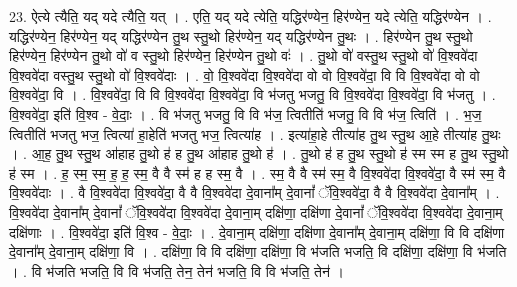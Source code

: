 \documentclass[17pt]{extarticle}
\begin{document}
23. ऐत्ये त्यैति॒ यद् यदे त्यैति॒ यत् । . एति॒ यद् यदे त्येति॒ यद्धिर॑ण्येन॒ हिर॑ण्येन॒ यदे त्येति॒ यद्धिर॑ण्येन । . यद्धिर॑ण्येन॒ हिर॑ण्येन॒ यद् यद्धिर॑ण्येन तु॒थ स्तु॒थो हिर॑ण्येन॒ यद् यद्धिर॑ण्येन तु॒थः । . हिर॑ण्येन तु॒थ स्तु॒थो हिर॑ण्येन॒ हिर॑ण्येन तु॒थो वो॑ व स्तु॒थो हिर॑ण्येन॒ हिर॑ण्येन तु॒थो वः॑ । . तु॒थो वो॑ वस्तु॒थ स्तु॒थो वो॑ वि॒श्ववे॑दा वि॒श्ववे॑दा वस्तु॒थ स्तु॒थो वो॑ वि॒श्ववे॑दाः । . वो॒ वि॒श्ववे॑दा वि॒श्ववे॑दा वो वो वि॒श्ववे॑दा॒ वि वि वि॒श्ववे॑दा वो वो वि॒श्ववे॑दा॒ वि । . वि॒श्ववे॑दा॒ वि वि वि॒श्ववे॑दा वि॒श्ववे॑दा॒ वि भ॑जतु भजतु॒ वि वि॒श्ववे॑दा वि॒श्ववे॑दा॒ वि भ॑जतु । . वि॒श्ववे॑दा॒ इति॑ वि॒श्व - वे॒दाः॒ । . वि भ॑जतु भजतु॒ वि वि भ॑ज॒ त्वितीति॑ भजतु॒ वि वि भ॑ज॒ त्विति॑ । . भ॒ज॒ त्वितीति॑ भजतु भज॒ त्वित्या॑ हा॒हेति॑ भजतु भज॒ त्वित्या॑ह । . इत्या॑हा॒हे तीत्या॑ह तु॒थ स्तु॒थ आ॒हे तीत्या॑ह तु॒थः । . आ॒ह॒ तु॒थ स्तु॒थ आ॑हाह तु॒थो ह॑ ह तु॒थ आ॑हाह तु॒थो ह॑ । . तु॒थो ह॑ ह तु॒थ स्तु॒थो ह॑ स्म स्म ह तु॒थ स्तु॒थो ह॑ स्म । . ह॒ स्म॒ स्म॒ ह॒ ह॒ स्म॒ वै वै स्म॑ ह ह स्म॒ वै । . स्म॒ वै वै स्म॑ स्म॒ वै वि॒श्ववे॑दा वि॒श्ववे॑दा॒ वै स्म॑ स्म॒ वै वि॒श्ववे॑दाः । . वै वि॒श्ववे॑दा वि॒श्ववे॑दा॒ वै वै वि॒श्ववे॑दा दे॒वाना᳚म् दे॒वानां᳚ ॅवि॒श्ववे॑दा॒ वै वै वि॒श्ववे॑दा दे॒वाना᳚म् । . वि॒श्ववे॑दा दे॒वाना᳚म् दे॒वानां᳚ ॅवि॒श्ववे॑दा वि॒श्ववे॑दा दे॒वाना॒म् दक्षि॑णा॒ दक्षि॑णा दे॒वानां᳚ ॅवि॒श्ववे॑दा वि॒श्ववे॑दा दे॒वाना॒म् दक्षि॑णाः । . वि॒श्ववे॑दा॒ इति॑ वि॒श्व - वे॒दाः॒ । . दे॒वाना॒म् दक्षि॑णा॒ दक्षि॑णा दे॒वाना᳚म् दे॒वाना॒म् दक्षि॑णा॒ वि वि दक्षि॑णा दे॒वाना᳚म् दे॒वाना॒म् दक्षि॑णा॒ वि । . दक्षि॑णा॒ वि वि दक्षि॑णा॒ दक्षि॑णा॒ वि भ॑जति भजति॒ वि दक्षि॑णा॒ दक्षि॑णा॒ वि भ॑जति । . वि भ॑जति भजति॒ वि वि भ॑जति॒ तेन॒ तेन॑ भजति॒ वि वि भ॑जति॒ तेन॑ । \newline
\end{document}
